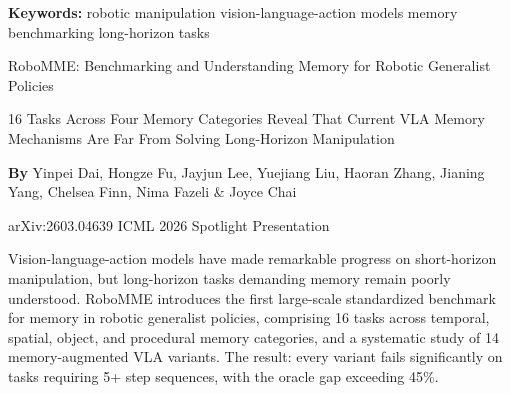 \documentclass[10pt,twocolumn]{article}
\begin{document}
\setlength{\parindent}{0pt}
\setlength{\parskip}{4pt}

{\small\color{keywordgray}\textbf{Keywords:}
  robotic manipulation \textbullet{}
  vision-language-action models \textbullet{}
  memory benchmarking \textbullet{}
  long-horizon tasks}\par\vspace{4pt}

{\LARGE\bfseries\raggedright
  RoboMME: Benchmarking and Understanding Memory for
  Robotic Generalist Policies}\par\vspace{4pt}

{\large\itshape\raggedright
  16 Tasks Across Four Memory Categories Reveal That Current VLA Memory
  Mechanisms Are Far From Solving Long-Horizon Manipulation}\par\vspace{6pt}

{\small\textbf{By} Yinpei Dai, Hongze Fu, Jayjun Lee, Yuejiang Liu,
  Haoran Zhang, Jianing Yang, Chelsea Finn, Nima Fazeli \& Joyce Chai}\par\vspace{2pt}

{\small\color{keywordgray}arXiv:2603.04639 \textbullet{}
  ICML 2026 Spotlight Presentation}
\par\vspace{2pt}\noindent{\color{rulered}\rule{\columnwidth}{0.6pt}}\vspace{6pt}

Vision-language-action models have made remarkable progress on short-horizon
manipulation, but long-horizon tasks demanding memory remain poorly understood.
RoboMME introduces the first large-scale standardized benchmark for memory in
robotic generalist policies, comprising 16 tasks across temporal, spatial,
object, and procedural memory categories, and a systematic study of 14
memory-augmented VLA variants. The result: every variant fails significantly on
tasks requiring 5+ step sequences, with the oracle gap exceeding 45\%.
\end{document}
